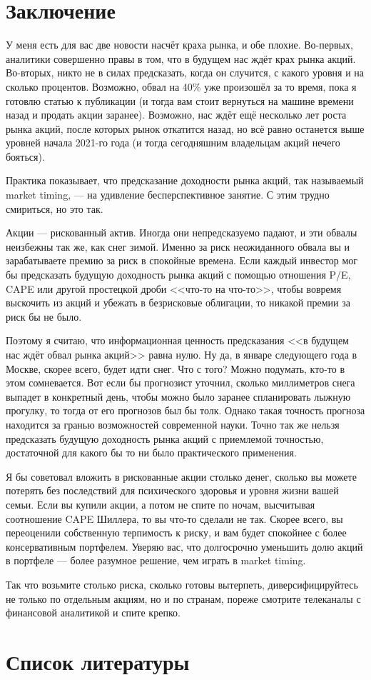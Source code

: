 \section*{Заключение}

У меня есть для вас две новости насчёт краха рынка, и обе плохие. Во-первых, аналитики совершенно правы в том, что в будущем нас ждёт крах рынка акций. Во-вторых, никто не в силах предсказать, когда он случится, с какого уровня и на сколько процентов. Возможно, обвал на 40\% уже произошёл за то время, пока я готовлю статью к публикации (и тогда вам стоит вернуться на машине времени назад и продать акции заранее). Возможно, нас ждёт ещё несколько лет роста рынка акций, после которых рынок откатится назад, но всё равно останется выше уровней начала 2021-го года (и тогда сегодняшним владельцам акций нечего бояться).

Практика показывает, что предсказание доходности рынка акций, так называемый market timing, --- на удивление бесперспективное занятие. С этим трудно смириться, но это так.

Акции --- рискованный актив. Иногда они непредсказуемо падают, и эти обвалы неизбежны так же, как снег зимой. Именно за риск неожиданного обвала вы и зарабатываете премию за риск в спокойные времена. Если каждый инвестор мог бы предсказать будущую доходность рынка акций с помощью отношения P/E, CAPE или другой простецкой дроби <<что-то на что-то>>, чтобы вовремя выскочить из акций и убежать в безрисковые облигации, то никакой премии за риск бы не было.

Поэтому я считаю, что информационная ценность предсказания <<в будущем нас ждёт обвал рынка акций>> равна нулю. Ну да, в январе следующего года в Москве, скорее всего, будет идти снег. Что с того? Можно подумать, кто-то в этом сомневается. Вот если бы прогнозист уточнил, сколько миллиметров снега выпадет в конкретный день, чтобы можно было заранее спланировать лыжную прогулку, то тогда от его прогнозов был бы толк. Однако такая точность прогноза находится за гранью возможностей современной науки. Точно так же нельзя предсказать будущую доходность рынка акций с приемлемой точностью, достаточной для какого бы то ни было практического применения.

Я бы советовал вложить в рискованные акции столько денег, сколько вы можете потерять без  последствий для психического здоровья и уровня жизни вашей семьи. Если вы купили акции, а потом не спите по ночам, высчитывая соотношение CAPE Шиллера, то вы что-то сделали не так. Скорее всего, вы переоценили собственную терпимость к риску, и вам будет спокойнее с более консервативным портфелем. Уверяю вас, что долгосрочно уменьшить долю акций в портфеле --- более разумное решение, чем играть в market timing.


Так что возьмите столько риска, сколько готовы вытерпеть, диверсифицируйтесь не только по отдельным акциям, но и по странам, пореже смотрите телеканалы с финансовой аналитикой и спите крепко.

\section*{Список литературы}
\en{
\printbibliography[heading = none]
}


